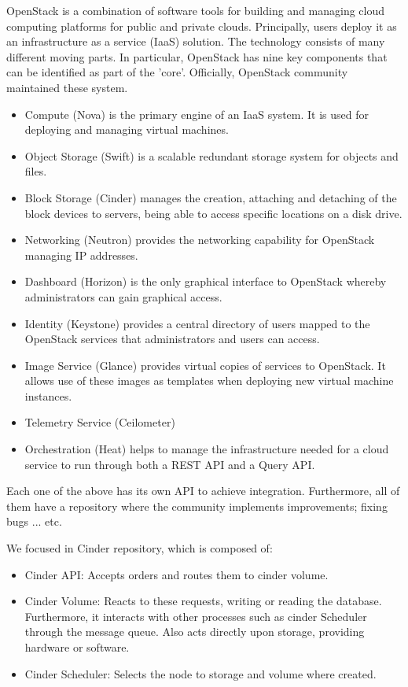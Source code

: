 \documentclass[a4paper]{article}
\begin{document}
OpenStack is a combination of software tools for building and managing cloud computing platforms for public and private clouds. Principally, users deploy it as an infrastructure as a service (IaaS) solution. The technology consists of many different moving parts. In particular, OpenStack has nine key components that can be identified as part of the 'core'. Officially, OpenStack community maintained these system. 

\begin{itemize}
    \item Compute (Nova) is the primary engine of an IaaS system. It is used for deploying and managing virtual machines.
    \item Object Storage (Swift) is a scalable redundant storage system for objects and files.
    \item Block Storage (Cinder) manages the creation, attaching and detaching of the block devices to servers, being able to access specific locations on a disk drive.
    \item Networking (Neutron) provides the networking capability for OpenStack managing IP addresses.
    \item Dashboard (Horizon) is the only graphical interface to OpenStack whereby administrators can gain graphical access.
    \item Identity (Keystone) provides a central directory of users mapped to the OpenStack services that administrators and users can access.
    \item  Image Service (Glance) provides virtual copies of services to OpenStack. It allows use of these images as templates when deploying new virtual machine instances. 
    \item Telemetry Service (Ceilometer) 
    \item Orchestration (Heat) helps to manage the infrastructure needed for a cloud service to run through both a REST API and a Query API.
\end{itemize}

Each one of the above has its own API to achieve integration. Furthermore, all of them have a repository where the community implements improvements; fixing bugs ... etc.

We focused in Cinder repository, which is composed of:
\begin{itemize}
    \item Cinder API: Accepts orders and routes them to cinder volume.
    \item Cinder Volume: Reacts to these requests, writing or reading the database. Furthermore, it interacts with other processes such as cinder Scheduler through the message queue. Also acts directly upon storage, providing hardware or software.
    \item Cinder Scheduler: Selects the node to storage and volume where created.
\end{itemize}
\end{document}
